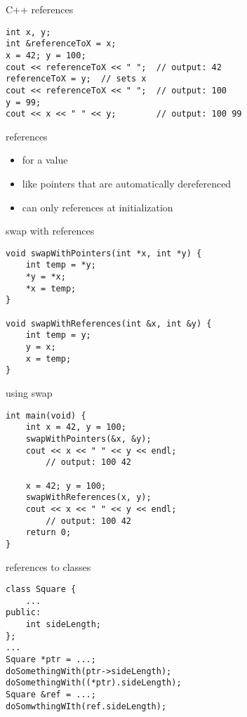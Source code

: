 \begin{frame}[fragile,label=cppReferences]{C++ references}
\lstset{
    language=C++,
    style=small
}
\begin{lstlisting}
int x, y;
int &referenceToX = x;
x = 42; y = 100;
cout << referenceToX << " ";  // output: 42
referenceToX = y;  // sets x
cout << referenceToX << " ";  // output: 100
y = 99;
cout << x << " " << y;        // output: 100 99
\end{lstlisting}
\end{frame}

\begin{frame}{references}
    \begin{itemize}
    \item {} for a value
    \item like pointers that are automatically dereferenced
    \item can only  references at initialization
    \end{itemize}
\end{frame}

\begin{frame}[fragile,label=swapRef]{swap with references}
\lstset{
    language=C++,
    style=small
}
\begin{lstlisting}
void swapWithPointers(int *x, int *y) {
    int temp = *y;
    *y = *x;
    *x = temp;
}

void swapWithReferences(int &x, int &y) {
    int temp = y;
    y = x;
    x = temp;
}
\end{lstlisting}
\end{frame}

\begin{frame}[fragile,label=usingSwap]{using swap}
\lstset{
    language=C++,
    style=small
}
\begin{lstlisting}
int main(void) {
    int x = 42, y = 100;
    swapWithPointers(&x, &y);
    cout << x << " " << y << endl; 
        // output: 100 42

    x = 42; y = 100;
    swapWithReferences(x, y);
    cout << x << " " << y << endl; 
        // output: 100 42
    return 0;
}
\end{lstlisting}
\end{frame}

\begin{frame}[fragile,label=refToClass]{references to classes}
\begin{lstlisting}
class Square {
    ...
public:
    int sideLength;
};
...
Square *ptr = ...;
doSomethingWith(ptr->sideLength);
doSomethingWith((*ptr).sideLength);
Square &ref = ...;
doSomwthingWIth(ref.sideLength);
\end{lstlisting}
\end{frame}
